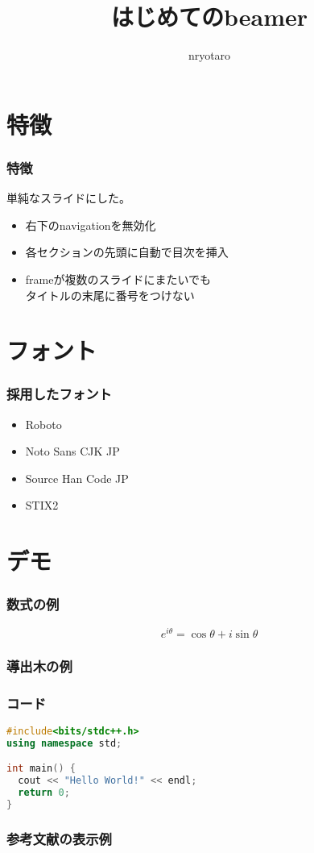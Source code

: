 \documentclass[unicode, 14pt]{beamer}
\title{はじめてのbeamer}
\author{nryotaro}
\begin{document}
\begin{frame}
\titlepage
\end{frame}
\section{特徴}
\begin{frame}[t]
  \frametitle{特徴}
  単純なスライドにした。
  \vspace{0.2\paperheight}
  \begin{itemize}
    \item 右下のnavigationを無効化
    \item 各セクションの先頭に自動で目次を挿入
    \item frameが複数のスライドにまたいでも\\タイトルの末尾に番号をつけない
  \end{itemize}
\end{frame}

\section{フォント}

\begin{frame}
\frametitle{採用したフォント}
\begin{itemize}
  \item Roboto
  \item Noto Sans CJK JP
  \item Source Han Code JP
  \item STIX2
\end{itemize}
\end{frame}

\section{デモ}

\begin{frame}
  \frametitle{数式の例}
  \begin{equation}
    e^{i\theta} = \cos\theta + i\sin \theta
  \end{equation}
\end{frame}

\begin{frame}
  \frametitle{導出木の例}
  \begin{prooftree}
  \end{prooftree}
\end{frame}

\begin{frame}[fragile]
\frametitle{コード}
  {\small 
    \begin{lstlisting}[language=C++]
#include<bits/stdc++.h>
using namespace std;

int main() {
  cout << "Hello World!" << endl;
  return 0;
}
    \end{lstlisting}
}
\end{frame}

\begin{frame}[allowframebreaks]
  \frametitle{参考文献の表示例}
  \printbibliography
  \nocite{*} 
\end{frame}
\end{document}
